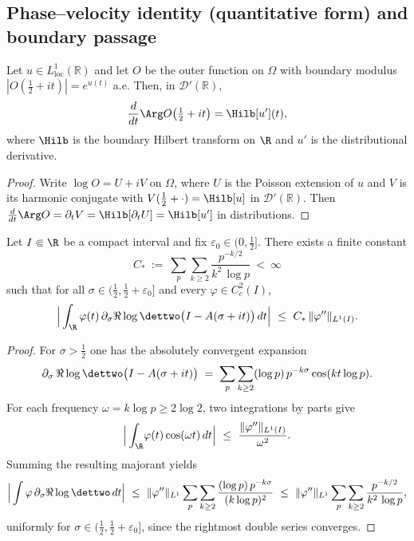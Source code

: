 \subsection*{Phase--velocity identity (quantitative form) and boundary passage}
\begin{lemma}\label{lem:outer-phase-HT}
Let \(u\in L^1_{\mathrm{loc}}(\mathbb R)\) and let \(O\) be the outer function on \(\Omega\) with boundary modulus \(|O(\tfrac12+it)|=e^{u(t)}\) a.e.
Then, in \(\mathcal D'(\mathbb R)\),
\[
  \frac{d}{dt}\Arg O\!\left(\tfrac12+it\right)=\Hilb[u'](t),
\]
where \(\Hilb\) is the boundary Hilbert transform on \(\R\) and \(u'\) is the distributional derivative.
\end{lemma}
\begin{proof}
Write \(\log O=U+iV\) on \(\Omega\), where \(U\) is the Poisson extension of \(u\) and \(V\) is its harmonic conjugate with \(V(\tfrac12+\cdot)=\Hilb[u]\) in \(\mathcal D'(\mathbb R)\).
Then \(\tfrac{d}{dt}\Arg O=\partial_t V=\Hilb[\partial_t U]=\Hilb[u']\) in distributions.
\end{proof}

\begin{lemma}\label{lem:det2-unsmoothed}
Let \(I\Subset\R\) be a compact interval and fix \(\varepsilon_0\in(0,\tfrac12]\).
There exists a finite constant
\[
  C_*\ :=\ \sum_{p}\sum_{k\ge 2}\frac{p^{-k/2}}{k^2\,\log p}\ <\ \infty
\]
such that for all \(\sigma\in(\tfrac12,\tfrac12+\varepsilon_0]\) and every \(\varphi\in C_c^2(I)\),
\[
  \Big|\int_{\R} \varphi(t)\,\partial_\sigma\Re\log\dettwo\big(I-A(\sigma+it)\big)\,dt\Big|\ \le\ C_*\,\|\varphi''\|_{L^1(I)}.
\]
\end{lemma}
\begin{proof}
For \(\sigma>\tfrac12\) one has the absolutely convergent expansion
\[
  \partial_\sigma\,\Re\log\dettwo\big(I-A(\sigma+it)\big)
  \;=\; \sum_{p}\sum_{k\ge 2} (\log p)\,p^{-k\sigma}\cos(k t\log p).
\]
For each frequency \(\omega=k\log p\ge 2\log 2\), two integrations by parts give
\[
  \Big|\int_{\R}\!\varphi(t)\cos(\omega t)\,dt\Big|\ \le\ \frac{\|\varphi''\|_{L^1(I)}}{\omega^2}.
\]
Summing the resulting majorant yields
\[
  \Big|\int \varphi\,\partial_\sigma\Re\log\dettwo\,dt\Big|
  \ \le\ \|\varphi''\|_{L^1}\sum_{p}\sum_{k\ge 2}\frac{(\log p)\,p^{-k\sigma}}{(k\log p)^2}
  \ \le\ \|\varphi''\|_{L^1}\sum_{p}\sum_{k\ge 2}\frac{p^{-k/2}}{k^2\,\log p},
\]
uniformly for \(\sigma\in(\tfrac12,\tfrac12+\varepsilon_0]\), since the rightmost double series converges.
\end{proof}

